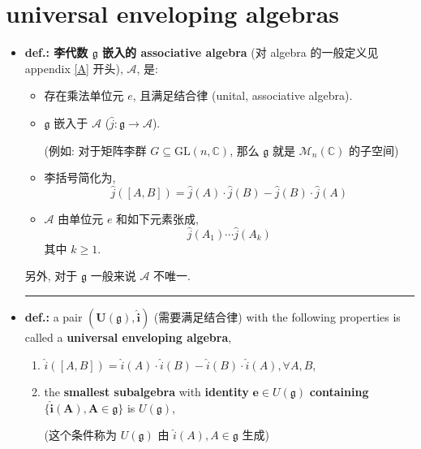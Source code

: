 \section{universal enveloping algebras}
\begin{itemize}
	\item \textbf{def.: 李代数 $\boldsymbol{\mathfrak{g}}$ 嵌入的 associative algebra} (对 algebra 的一般定义见 appendix \ref{A} 开头), $\mathcal{A}$, 是:
	\begin{itemize}
		\item 存在乘法单位元 $e$, 且满足结合律 (unital, associative algebra).
		
		\item $\mathfrak{g}$ 嵌入于 $\mathcal{A}$ ($\hat{j} : \mathfrak{g} \rightarrow \mathcal{A}$).
		
		(例如: 对于矩阵李群 $G \subseteq \mathrm{GL}(n, \mathbb{C})$, 那么 $\mathfrak{g}$ 就是 $\mathcal{M}_n(\mathbb{C})$ 的子空间)
		
		\item 李括号简化为,
		\begin{equation}
			\hat{j}([A, B]) = \hat{j}(A) \cdot \hat{j}(B) - \hat{j}(B) \cdot \hat{j}(A)
		\end{equation}
		
		\item $\mathcal{A}$ 由单位元 $e$ 和如下元素张成,
		\begin{equation} \label{8.3.2}
			\hat{j}(A_1) \cdots \hat{j}(A_k)
		\end{equation}
		其中 $k \geq 1$.
	\end{itemize}
	另外, 对于 $\mathfrak{g}$ 一般来说 $\mathcal{A}$ 不唯一.
	
	\noindent\rule[0.5ex]{\linewidth}{0.5pt} %
	
	\item \textbf{def.:} a pair $\boldsymbol{(U(\mathfrak{g}), \hat{i})}$ (需要满足结合律) with the following properties is called a \textbf{universal enveloping algebra},
	\begin{enumerate}
		\item $\hat{i}([A, B]) = \hat{i}(A) \cdot \hat{i}(B) - \hat{i}(B) \cdot \hat{i}(A), \forall A, B$,
		
		\item the \textbf{smallest subalgebra} with \textbf{identity} $\boldsymbol{e} \in U(\mathfrak{g})$ \textbf{containing} $\boldsymbol{\{\hat{i}(A), A \in \mathfrak{g}\}}$ is $U(\mathfrak{g})$,
		
		(这个条件称为 $U(\mathfrak{g})$ 由 $\hat{i}(A), A \in \mathfrak{g}$ 生成)
		

\end{enumerate}
\end{itemize}
